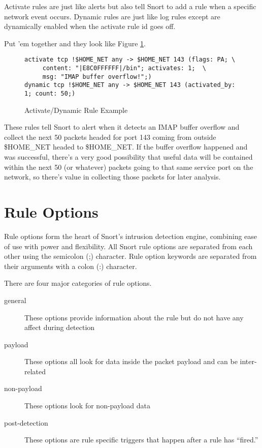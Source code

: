\documentclass[english]{report}
\begin{document}
Activate rules are just like alerts but also tell Snort to add a rule
when a specific network event occurs. Dynamic rules are just like
log rules except are dynamically enabled when the activate rule id
goes off. 

Put 'em together and they look like Figure \ref{activate/dynamic rule example}.

%
\begin{figure}[!hbpt]
\begin{verbatim}
activate tcp !$HOME_NET any -> $HOME_NET 143 (flags: PA; \
     content: "|E8C0FFFFFF|/bin"; activates: 1;  \
     msg: "IMAP buffer overflow!";)
dynamic tcp !$HOME_NET any -> $HOME_NET 143 (activated_by: 1; count: 50;)
\end{verbatim}

\caption{Activate/Dynamic Rule Example\label{activate/dynamic rule example}}
\end{figure}

These rules tell Snort to alert when it detects an IMAP buffer overflow
and collect the next 50 packets headed for port 143 coming from outside
\$HOME\_NET headed to \$HOME\_NET. If the buffer overflow happened
and was successful, there's a very good possibility that useful data
will be contained within the next 50 (or whatever) packets going to
that same service port on the network, so there's value in collecting
those packets for later analysis.

\newpage
\section{Rule Options}

Rule options form the heart of Snort's intrusion detection engine, combining
ease of use with power and flexibility. All Snort rule options are separated
from each other using the semicolon (;) character. Rule option keywords are
separated from their arguments with a colon (:) character. 

There are four major categories of rule options.  
\begin{description}
\item [general] These options provide information about the rule but do not have any affect during detection 
\item [payload] These options all look for data inside the packet payload and can be inter-related
\item [non-payload] These options look for non-payload data
\item [post-detection] These options are rule specific triggers that happen after a rule has ``fired.''
\end{description}
\end{document}
